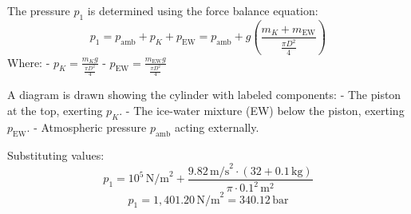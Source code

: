 The pressure \( p_1 \) is determined using the force balance equation:  
\[
p_1 = p_{\text{amb}} + p_K + p_{\text{EW}} = p_{\text{amb}} + g \left( \frac{m_K + m_{\text{EW}}}{\frac{\pi D^2}{4}} \right)
\]  
Where:  
- \( p_K = \frac{m_K g}{\frac{\pi D^2}{4}} \)  
- \( p_{\text{EW}} = \frac{m_{\text{EW}} g}{\frac{\pi D^2}{4}} \)  

A diagram is drawn showing the cylinder with labeled components:  
- The piston at the top, exerting \( p_K \).  
- The ice-water mixture (EW) below the piston, exerting \( p_{\text{EW}} \).  
- Atmospheric pressure \( p_{\text{amb}} \) acting externally.  

Substituting values:  
\[
p_1 = 10^5 \, \text{N/m}^2 + \frac{9.82 \, \text{m/s}^2 \cdot (32 + 0.1 \, \text{kg})}{\pi \cdot 0.1^2 \, \text{m}^2}
\]  
\[
p_1 = 1,401.20 \, \text{N/m}^2 = 340.12 \, \text{bar}
\]